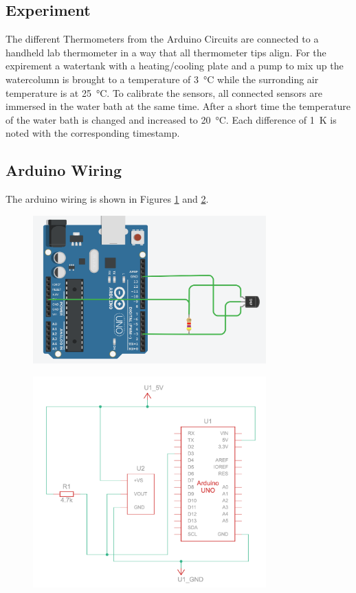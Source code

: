 \subsection{Experiment}
The different Thermometers from the Arduino Circuits are connected to a handheld lab thermometer in a way that all thermometer tips align.
For the expirement a watertank with a heating/cooling plate and a pump to mix up the watercolumn is brought to a temperature of \SI{3}{\celsius} while the surronding air temperature is at \SI{25}{\celsius}.
To calibrate the sensors, all connected sensors are immersed in the water bath at the same time.
After a short time the temperature of the water bath is changed and increased to \SI{20}{\celsius}.
Each difference of \SI{1}{\kelvin} is noted with the corresponding timestamp.

\subsection{Arduino Wiring}
The arduino wiring is shown in Figures \ref{fig:wiring1} and \ref{fig:wiring2}.
\begin{figure}
    \centering 
    \includegraphics[width = 0.8\textwidth]{bilder/wiring_1.png}
    \label{fig:wiring1}
\end{figure}
\begin{figure}
    \centering 
    \includegraphics[width = 0.8\textwidth]{bilder/wiring_2.png}
    \label{fig:wiring2}
\end{figure}
